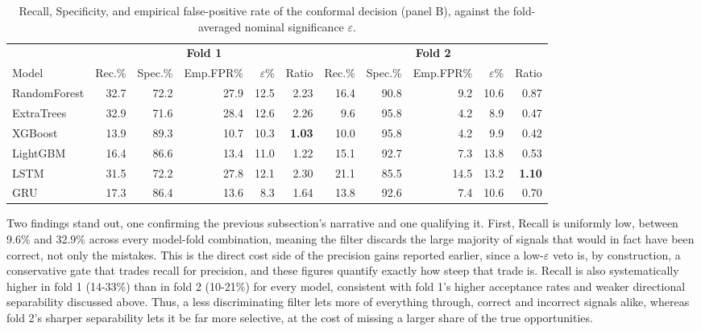 \documentclass[12pt, a4paper]{article}
\begin{document}
\begin{table}[H]
\centering
\footnotesize
\begin{tabular}{l|rrrrr||rrrrr}
\toprule
 & \multicolumn{5}{c||}{\textbf{Fold 1}} & \multicolumn{5}{c}{\textbf{Fold 2}} \\
Model & Rec.\% & Spec.\% & Emp.FPR\% & $\varepsilon$\% & Ratio & Rec.\% & Spec.\% & Emp.FPR\% & $\varepsilon$\% & Ratio \\
\midrule
RandomForest & 32.7 & 72.2 & 27.9 & 12.5 & 2.23 & 16.4 & 90.8 & 9.2  & 10.6 & 0.87 \\
ExtraTrees   & 32.9 & 71.6 & 28.4 & 12.6 & 2.26 & 9.6  & 95.8 & 4.2  & 8.9  & 0.47 \\
XGBoost      & 13.9 & 89.3 & 10.7 & 10.3 & \textbf{1.03} & 10.0 & 95.8 & 4.2  & 9.9  & 0.42 \\
LightGBM     & 16.4 & 86.6 & 13.4 & 11.0 & 1.22 & 15.1 & 92.7 & 7.3  & 13.8 & 0.53 \\
LSTM         & 31.5 & 72.2 & 27.8 & 12.1 & 2.30 & 21.1 & 85.5 & 14.5 & 13.2 & \textbf{1.10} \\
GRU          & 17.3 & 86.4 & 13.6 & 8.3  & 1.64 & 13.8 & 92.6 & 7.4  & 10.6 & 0.70 \\
\bottomrule
\end{tabular}
\caption{Recall, Specificity, and empirical false-positive rate of the conformal decision (panel B), against the fold-averaged nominal significance $\varepsilon$.}
\label{tab:nested_confusion_summary}
\end{table}

Two findings stand out, one confirming the previous subsection's narrative and one qualifying it.
First, Recall is uniformly low, between 9.6\% and 32.9\% across every model-fold combination, meaning the filter discards the large majority of signals that would in fact have 
been correct, not only the mistakes. This is the direct cost side of the precision gains reported earlier, since a low-$\varepsilon$ veto is, by construction, a conservative gate that 
trades recall for precision, and these figures quantify exactly how steep that trade is. Recall is also systematically higher in fold 1 (14-33\%) than in fold 2 (10-21\%) for 
every model, consistent with fold 1's higher acceptance rates and weaker directional separability discussed above. Thus, a less discriminating filter lets more of everything 
through, correct and incorrect signals alike, whereas fold 2's sharper separability lets it be far more selective, at the cost of missing a larger share of the true opportunities.
\end{document}
